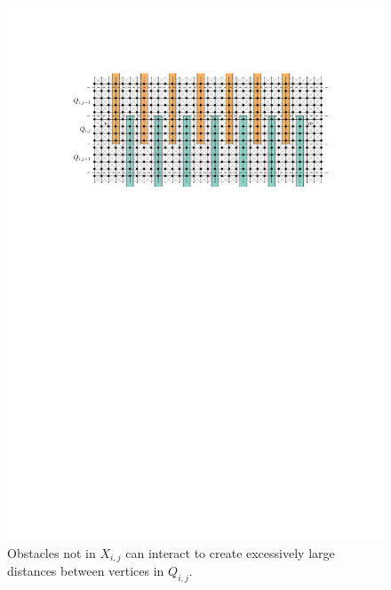 \documentclass{patmorin}
\begin{document}


\begin{figure}
  \centering
  \includegraphics{figs/bad_combination}
  \caption{Obstacles not in $X_{i,j}$ can interact to create excessively large distances between vertices in $Q_{i,j}$.}
  \label{big_distance}
\end{figure}
\end{document}
